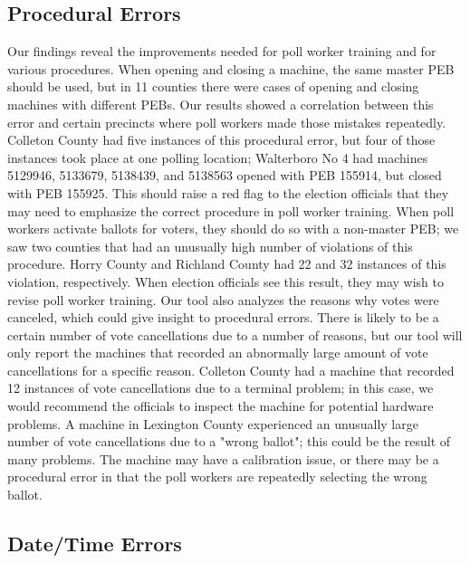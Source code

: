 \subsection{Procedural Errors}
Our findings reveal the improvements needed for poll worker training and for various procedures.  When opening and closing a machine, the same master PEB should be used, but in 11 counties there were cases of opening and closing machines with different PEBs.  Our results showed a correlation between this error and certain precincts where poll workers made those mistakes repeatedly.  Colleton County had five instances of this procedural error, but four of those instances took place at one polling location; Walterboro No 4 had machines 5129946, 5133679, 5138439, and 5138563 opened with PEB 155914, but closed with PEB 155925.  This should raise a red flag to the election officials that they may need to emphasize the correct procedure in poll worker training.  When poll workers activate ballots for voters, they should do so with a non-master PEB; we saw two counties that had an unusually high number of violations of this procedure.  Horry County and Richland County had 22 and 32 instances of this violation, respectively.  When election officials see this result, they may wish to revise poll worker training.  Our tool also analyzes the reasons why votes were canceled, which could give insight to procedural errors.  There is likely to be a certain number of vote cancellations due to a number of reasons, but our tool will only report the machines that recorded an abnormally large amount of vote cancellations for a specific reason.  Colleton County had a machine that recorded 12 instances of vote cancellations due to a terminal problem; in this case, we would recommend the officials to inspect the machine for potential hardware problems.  A machine in Lexington County experienced an unusually large number of vote cancellations due to a "wrong ballot"; this could be the result of many problems.  The machine may have a calibration issue, or there may be a procedural error in that the poll workers are repeatedly selecting the wrong ballot.

\subsection{Date/Time Errors}
